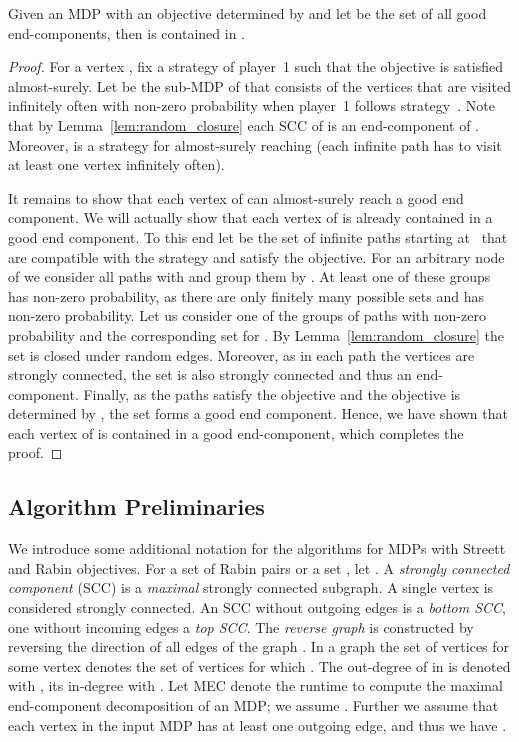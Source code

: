 \documentclass[11pt,letterpaper]{article}
\newcommand{\lu}{\textup{(}}
\newcommand{\ru}{\textup{)}\xspace}
\newcommand{\upbr}[1]{\lu #1\ru}
\begin{document}
\begin{proposition}\label{prop:geccompl-gen}
    Given an MDP  with an objective  determined by 
    and let  be the set of all good  end-components,
    then  is contained in  .
\end{proposition}
\begin{proof}
  For a vertex ,
  fix a strategy  of player~1 such that the objective is satisfied almost-surely. 
  Let  be the sub-MDP of  that consists of the vertices that 
  are visited infinitely often with non-zero probability when player~1 follows strategy~.
  Note that by Lemma~\ref{lem:random_closure} each SCC of  is an 
  end-component of .
  Moreover,  is a strategy for almost-surely reaching  
  (each infinite path has to visit at least one vertex infinitely often).
  
  It remains to show that each vertex of  can almost-surely reach 
  a good end component. 
  We will actually show that each vertex of  is already contained in a good end component.
  To this end let  be the set of infinite paths starting at~
  that are compatible with the strategy  and satisfy the objective.
  For an arbitrary node  of  we consider all paths 
   with  and group them by .
  At least one of these groups has non-zero probability, 
  as there are only finitely many possible sets  and  has non-zero probability.  
  Let us consider one of the groups of paths  with non-zero probability 
  and the corresponding set  for .
  By Lemma~\ref{lem:random_closure} the set  is closed under random edges.
  Moreover, as in each path  the vertices  are strongly connected, the
  set  is also strongly connected and thus an end-component.
  Finally, as the paths  satisfy the objective
  and the objective  is determined by , the set 
  forms a good end component.
  Hence, we have shown that each vertex of  is contained in a good  
  end-component, which completes the proof.
\end{proof}

\subsection{Algorithm Preliminaries}\label{sec:algprelim}
We introduce some additional notation for the algorithms for MDPs with Streett 
and Rabin objectives.
For a set 
of Rabin pairs or a set , 
let .
A \emph{strongly connected component} \upbr{SCC} is a \emph{maximal} strongly 
connected subgraph. A single vertex is considered strongly connected. An SCC without
outgoing edges is a \emph{bottom SCC}, one without incoming edges a \emph{top SCC}.
The \emph{reverse graph}  is constructed by reversing the direction of 
all edges of the graph . In a graph  the set of vertices  
for some vertex  denotes the set of vertices  for which .
The out-degree of  in  is denoted with , its in-degree
with . Let \textsc{MEC} denote the runtime to compute the maximal 
end-component decomposition of an MDP; we assume .
Further we assume that each vertex in the input MDP 
has at least one outgoing edge, and thus we have .
\end{document}
